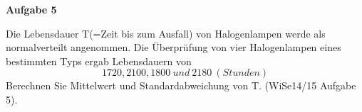\documentclass[a4paper,12pt]{article}
\newcommand{\Aufgabe}[1]{
  {
  \vspace*{0.5cm}
  \textsf{\textbf{Aufgabe #1}}
  \vspace*{0.2cm}
  
  }
}
\begin{document}
 
\Aufgabe{5}
Die Lebensdauer T(=Zeit bis zum Ausfall) von Halogenlampen werde als normalverteilt angenommen. Die Überprüfung von vier Halogenlampen eines bestimmten Typs ergab Lebensdauern von
$$ 1720, 2100, 1800 \ und  \ 2180\ (Stunden) 
$$
Berechnen Sie Mittelwert und Standardabweichung von T.
 (WiSe14/15 Aufgabe 5).

\end{document}
